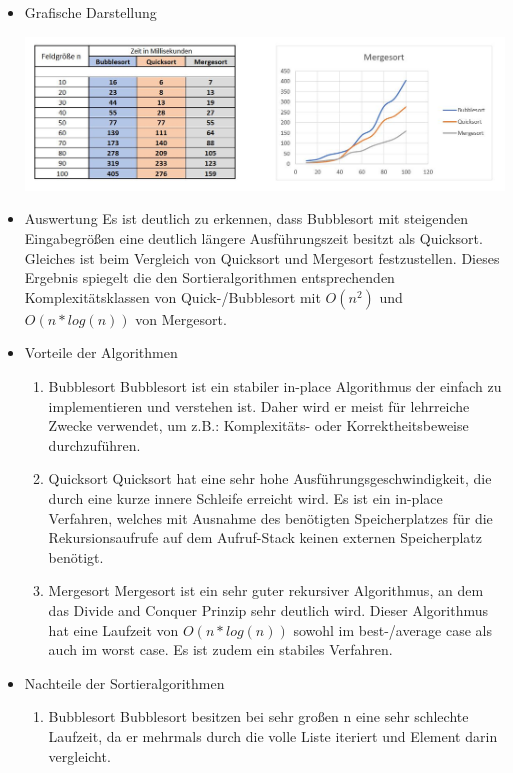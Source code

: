 	\begin{itemize}
		\item Grafische Darstellung \\
		\begin{center}
			\includegraphics[width=1\textwidth]{src/Daten_Sortieralgorithmen.jpg}
		\end{center}
		\item Auswertung 
		Es ist deutlich zu erkennen, dass Bubblesort mit steigenden Eingabegrößen eine deutlich längere Ausführungszeit besitzt als Quicksort. Gleiches ist beim Vergleich von Quicksort und Mergesort festzustellen. Dieses Ergebnis spiegelt die den Sortieralgorithmen entsprechenden Komplexitätsklassen von Quick-/Bubblesort mit $O(n^2)$ und $O(n*log(n))$ von Mergesort. 
		\item Vorteile der Algorithmen
			\begin{enumerate}
				\item Bubblesort
					Bubblesort ist ein stabiler in-place Algorithmus der einfach zu implementieren und verstehen ist. Daher wird er meist für lehrreiche Zwecke verwendet, um z.B.: Komplexitäts- oder Korrektheitsbeweise durchzuführen.
				\item Quicksort
					Quicksort hat eine sehr hohe Ausführungsgeschwindigkeit, die durch eine kurze innere Schleife erreicht wird. Es ist ein in-place Verfahren, welches mit Ausnahme des benötigten Speicherplatzes für die Rekursionsaufrufe auf dem Aufruf-Stack keinen externen Speicherplatz benötigt. 
				\item Mergesort
				Mergesort ist ein sehr guter rekursiver Algorithmus, an dem das Divide and Conquer Prinzip sehr deutlich wird. Dieser Algorithmus hat eine Laufzeit von $O(n*log(n))$ sowohl im best-/average case als auch im worst case. Es ist zudem ein stabiles Verfahren. 
			\end{enumerate}
		\item Nachteile der Sortieralgorithmen
			\begin{enumerate}
				\item Bubblesort
					Bubblesort besitzen bei sehr großen n eine sehr schlechte Laufzeit, da er mehrmals durch die volle Liste iteriert und Element darin vergleicht. 			

\end{enumerate}
\end{itemize}
